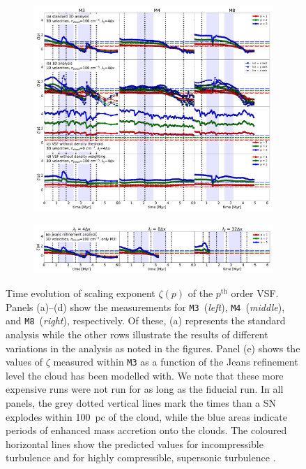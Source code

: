 \documentclass{aa}		%
\begin{document}
\begin{figure}[!htb]
	\centering  
  
  \begin{subfigure}[c]{\textwidth}
      \includegraphics[width=\textwidth]{zeta_all_nojeans.pdf}
      \label{pic:results:zeta_all_nojeans}
  \end{subfigure}
  \begin{subfigure}[c]{\textwidth}
      \addtocounter{subfigure}{4}
      \includegraphics[width=\textwidth]{zeta_jeans.pdf}
      \label{pic:results:zeta_all_jeans}
  \end{subfigure}
  
  \caption{Time evolution of scaling exponent $\zeta(p)$ of the $p^\mathrm{th}$ order VSF. Panels (a)--(d) show the measurements for \texttt{M3}~(\textit{left}), \texttt{M4}~(\textit{middle}), and \texttt{M8}~(\textit{right}), respectively. Of these, (a) represents the standard analysis while the other rows illustrate the results of different variations in the analysis as noted in the figures. Panel (e) shows the values of $\zeta$ measured within \texttt{M3} as a function of the Jeans refinement level the cloud has been modelled with. We note that these more expensive runs were not run for as long as the fiducial run.  In all panels, the grey dotted vertical lines mark the times than a SN explodes within 100~pc of the cloud, while the blue areas indicate periods of enhanced mass accretion onto the clouds. The coloured horizontal lines show the predicted values for incompressible turbulence \citep[dash-dotted lines;][]{She1994} and for highly compressible, supersonic turbulence \citep[dashed lines;][]{Boldyrev2002}.
	\label{pic:results:zeta_all}
}
\end{figure}
\end{document}
